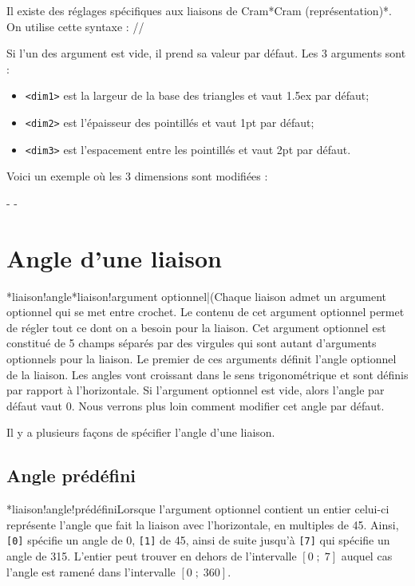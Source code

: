 \documentclass[10pt]{article}
\makeatletter
\newcommand\idx{\@ifstar{\let\print@or@not\@gobble\idx@}{\let\print@or@not\@firstofone\idx@}}
\newcommand\idx@[1]{%
	\ifcat\expandafter\noexpand\@car#1\@nil\relax%
		\expandafter\ifx\@car#1\@nil\protect
			\index{#1}%
			\print@or@not{#1}%
		\else
			\saveexpandmode\expandarg
			\StrSubstitute{\string#1}{\string @}{\@empty\protect\symbol{'100}}[\temp@]%
			\StrGobbleLeft\temp@1[\temp@]%
			\restoreexpandmode
			\expandafter\index\expandafter{\temp@ @\protect\texttt{\protect\textbackslash\temp@}}%
			\print@or@not{\texttt{\string#1}}%
		\fi
	\else
		\index{#1}%
		\print@or@not{#1}%
	\fi
}
\newcommand\make@car@active[1]{%
	\catcode`#1\active
	\begingroup
		\lccode`\~`#1\relax
		\lowercase{\endgroup\def~}%
}
\newif\if@exstar
\newcommand\exemple{%
	\begingroup
	\parskip\z@
	\@makeother\;\@makeother\!\@makeother\?\@makeother\:%
	\@ifstar{\@exstartrue\exemple@}{\@exstarfalse\exemple@}}
\newcommand\exemple@[2][65]{%
	\medbreak\noindent
	\begingroup
		\let\do\@makeother\dospecials
		\make@car@active\ { {}}%
		\make@car@active\^^M{\par\leavevmode}%
		\make@car@active\,{\leavevmode\kern\z@\string,}%
		\make@car@active\-{\leavevmode\kern\z@\string-}%
		\make@car@active\>{\leavevmode\kern\z@\string>}%
		\make@car@active\<{\leavevmode\kern\z@\string<}%
		\exemple@@{#1}{#2}%
}
\newcommand\exemple@@[3]{%
	\def\@tempa##1#3{\exemple@@@{#1}{#2}{##1}}%
	\@tempa
}
\newcommand\exemple@@@[3]{%
	\xdef\the@code{#3}%
	\endgroup
	\if@exstar
		\begingroup
			\fboxrule0.4pt
			\let\breakboxparindent\z@
			\def\bkvz@bottom{\hrule\@height\fboxrule}%
			\let\bkvz@before@breakbox\relax
			\def\bkvz@set@linewidth{\advance\linewidth\dimexpr-2\fboxrule-2\fboxsep}%
			\def\bkvz@left{\vrule\@width\fboxrule\hskip\fboxsep}%
			\def\bkvz@right{\hskip\fboxsep\vrule\@width\fboxrule}%
			\def\bkvz@top{\hbox to \hsize{%
				\vrule\@width\fboxrule\@height\fboxrule
				\leaders\bkvz@bottom\hfill
				\ECFAugie
				\fboxsep\z@
				\colorbox{black}{\kern0.25em\color{white}\footnotesize\lower0.5ex\hbox{\strut#2}\kern0.25em}%
				\leaders\bkvz@bottom\hfill
				\vrule\@width\fboxrule\@height\fboxrule}}%
			\breakbox
				\kern.5ex\relax
				\ttfamily\footnotesize\the@code\par
				\normalfont
				\kern3pt
				\hrule height0.1pt width\linewidth depth0.1pt
				\vskip5pt
				\rightskip0pt plus 1fill
				\everypar{{\color{lightgray}\rlap{\vrule height0.1pt width\linewidth depth0.1pt}}\hskip0pt plus 1fill}%
				\newlinechar`\^^M\everyeof{\noexpand}\scantokens{#3}\par
			\endbreakbox
		\endgroup
	\else
		\vskip0.5ex
		\boxput*(0,1)
			{\fboxsep\z@
			\hbox{\ECFAugie\colorbox{black}{\leavevmode\kern0.25em{\color{white}\footnotesize\strut#2}\kern0.25em}}%
			}%
			{\fboxsep5pt
			\fbox{%
				$\vcenter{\hsize\dimexpr0.#1\linewidth-\fboxsep-\fboxrule\relax
					\kern5pt\parskip0pt \ttfamily\footnotesize\the@code}%
				\vcenter{\kern5pt\hsize\dimexpr\linewidth-0.#1\linewidth-\fboxsep-\fboxrule\relax
					\everypar{{\color{lightgray}\rlap{\vrule height0.1pt width\dimexpr\linewidth-0.#1\linewidth-\fboxsep-\fboxrule depth0.1pt}}}%
					\footnotesize\newlinechar`\^^M\everyeof{\noexpand}\scantokens{#3}}$%
				}%
			}%
	\fi
	\medbreak
	\endgroup
}
\let\do\@makeother\dospecials
\makeatother
\begin{document}
Il existe des réglages spécifiques aux liaisons de Cram\idx*{Cram (représentation)}\idx*\setcrambond. On utilise cette syntaxe :\label{setcrambond}
\centerverb//
\smallskip

Si l'un des argument est vide, il prend sa valeur par défaut. Les 3 arguments sont :
\begin{itemize}
	\item \verb-<dim1>- est la largeur de la base des triangles et vaut 1.5ex par défaut;
	\item \verb-<dim2>- est l'épaisseur des pointillés et vaut 1pt par défaut;
	\item \verb-<dim3>- est l'espacement entre les pointillés et vaut 2pt par défaut.
\end{itemize}

Voici un exemple où les 3 dimensions sont modifiées :

\exemple{Liaison de Cram modifiée}-\setcrambond{10pt}{0.4pt}{1pt}
-

\section{Angle d'une liaison}
\idx*{liaison!angle}\idx*{liaison!argument optionnel|(}Chaque liaison admet un argument optionnel qui se met entre crochet. Le contenu de cet argument optionnel permet de régler tout ce dont on a besoin pour la liaison. Cet argument optionnel est constitué de 5 champs séparés par des virgules qui sont autant d'arguments optionnels pour la liaison. Le premier de ces arguments définit l'angle optionnel de la liaison. Les angles vont croissant dans le sens trigonométrique et sont définis par rapport à l'horizontale. Si l'argument optionnel est vide, alors l'angle par défaut vaut 0\degres. Nous verrons plus loin comment modifier cet angle par défaut.

Il y a plusieurs façons de spécifier l'angle d'une liaison.
\subsection{Angle prédéfini}
\idx*{liaison!angle!prédéfini}Lorsque l'argument optionnel contient un entier celui-ci représente l'angle que fait la liaison avec l'horizontale, en multiples de 45\degres. Ainsi, \verb-[0]- spécifie un angle de 0\degres, \verb-[1]- de 45\degres, ainsi de suite jusqu'à \verb-[7]- qui spécifie un angle de 315\degres. L'entier peut trouver en dehors de l'intervalle $[0\;;\;7]$ auquel cas l'angle est ramené dans l'intervalle $[0\;;\;360]$.
\end{document}
